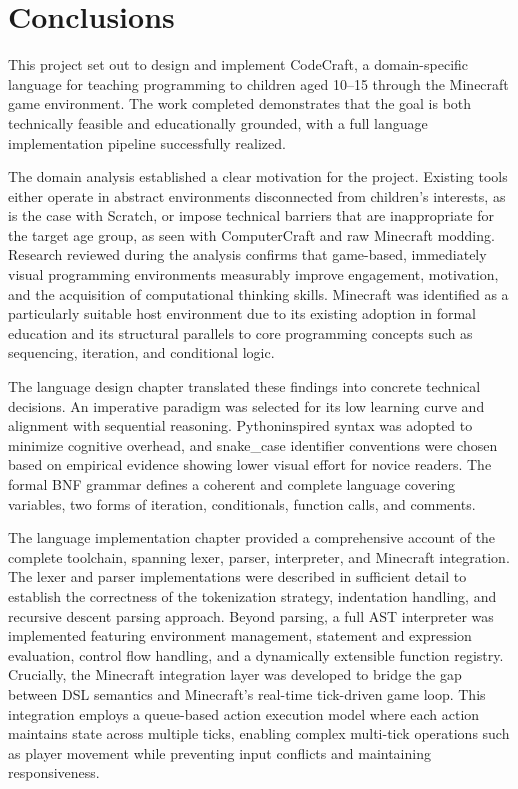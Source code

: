 \chapter*{Conclusions}

This project set out to design and implement CodeCraft, a domain-specific language for teaching programming to children aged 10–15 through the Minecraft game environment.
The work completed demonstrates that the goal is both technically feasible and educationally grounded, with a full language implementation pipeline successfully realized.

The domain analysis established a clear motivation for the project. 
Existing tools either operate in abstract environments disconnected from children's interests, as is the case with Scratch, or impose technical barriers that are inappropriate for the target age group, as seen with ComputerCraft and raw Minecraft modding. 
Research reviewed during the analysis confirms that game-based, immediately visual programming environments measurably improve engagement, motivation, and the acquisition of computational thinking skills. 
Minecraft was identified as a particularly suitable host environment due to its existing adoption in formal education and its structural parallels to core programming concepts such as sequencing, iteration, and conditional logic.

The language design chapter translated these findings into concrete technical decisions. 
An imperative paradigm was selected for its low learning curve and alignment with sequential reasoning. 
Python\-inspired syntax was adopted to minimize cognitive overhead, and snake\_case identifier conventions were chosen based on empirical evidence showing lower visual effort for novice readers. 
The formal BNF grammar defines a coherent and complete language covering variables, two forms of iteration, conditionals, function calls, and comments.

The language implementation chapter provided a comprehensive account of the complete toolchain, spanning lexer, parser, interpreter, and Minecraft integration.
The lexer and parser implementations were described in sufficient detail to establish the correctness of the tokenization strategy, indentation handling, and recursive descent parsing approach.
Beyond parsing, a full AST interpreter was implemented featuring environment management, statement and expression evaluation, control flow handling, and a dynamically extensible function registry.
Crucially, the Minecraft integration layer was developed to bridge the gap between DSL semantics and Minecraft's real-time tick-driven game loop.
This integration employs a queue-based action execution model where each action maintains state across multiple ticks, enabling complex multi-tick operations such as player movement while preventing input conflicts and maintaining responsiveness.

